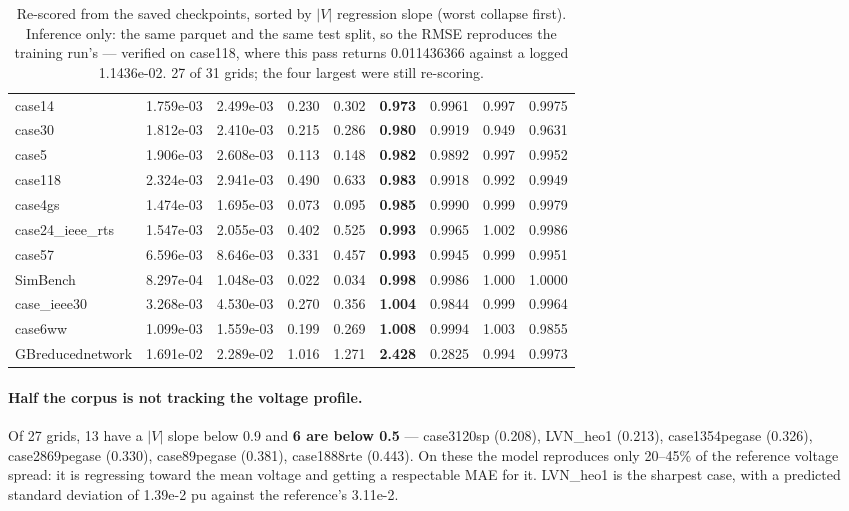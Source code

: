 \documentclass[10pt]{article}
\begin{document}
\begin{table}[H]
\begin{tabular}{lrrrrrrrr}
case14 & 1.759e-03 & 2.499e-03 & 0.230 & 0.302 & \textbf{0.973} & 0.9961 & 0.997 & 0.9975 \\
case30 & 1.812e-03 & 2.410e-03 & 0.215 & 0.286 & \textbf{0.980} & 0.9919 & 0.949 & 0.9631 \\
case5 & 1.906e-03 & 2.608e-03 & 0.113 & 0.148 & \textbf{0.982} & 0.9892 & 0.997 & 0.9952 \\
case118 & 2.324e-03 & 2.941e-03 & 0.490 & 0.633 & \textbf{0.983} & 0.9918 & 0.992 & 0.9949 \\
case4gs & 1.474e-03 & 1.695e-03 & 0.073 & 0.095 & \textbf{0.985} & 0.9990 & 0.999 & 0.9979 \\
case24\_ieee\_rts & 1.547e-03 & 2.055e-03 & 0.402 & 0.525 & \textbf{0.993} & 0.9965 & 1.002 & 0.9986 \\
case57 & 6.596e-03 & 8.646e-03 & 0.331 & 0.457 & \textbf{0.993} & 0.9945 & 0.999 & 0.9951 \\
SimBench & 8.297e-04 & 1.048e-03 & 0.022 & 0.034 & \textbf{0.998} & 0.9986 & 1.000 & 1.0000 \\
case\_ieee30 & 3.268e-03 & 4.530e-03 & 0.270 & 0.356 & \textbf{1.004} & 0.9844 & 0.999 & 0.9964 \\
case6ww & 1.099e-03 & 1.559e-03 & 0.199 & 0.269 & \textbf{1.008} & 0.9994 & 1.003 & 0.9855 \\
GBreducednetwork & 1.691e-02 & 2.289e-02 & 1.016 & 1.271 & \textbf{2.428} & 0.2825 & 0.994 & 0.9973 \\
\bottomrule
\end{tabular}
\caption{Re-scored from the saved checkpoints, sorted by $|V|$ regression slope
(worst collapse first). Inference only: the same parquet and the same test
split, so the RMSE reproduces the training run's --- verified on case118, where
this pass returns 0.011436366 against a logged 1.1436e-02. 27 of 31 grids;
the four largest were still re-scoring.}
\end{table}

\paragraph{Half the corpus is not tracking the voltage profile.} Of 27 grids,
13 have a $|V|$ slope below 0.9 and \textbf{6 are below 0.5} --- case3120sp
(0.208), LVN\_heo1 (0.213), case1354pegase (0.326), case2869pegase (0.330),
case89pegase (0.381), case1888rte (0.443). On these the model reproduces only
20--45\% of the reference voltage spread: it is regressing toward the mean
voltage and getting a respectable MAE for it. LVN\_heo1 is the sharpest case,
with a predicted standard deviation of 1.39e-2 pu against the reference's
3.11e-2.
\end{document}
